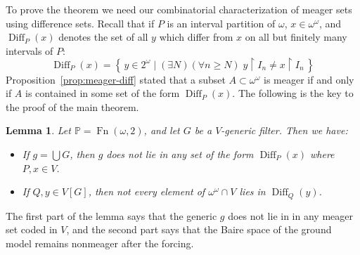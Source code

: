 \documentclass[11pt,oneside,a4paper]{amsbook}
\newcommand{\set}[1]{\left\{\,#1\,\right\}}
\newcommand{\PP}{\mathbb P}
\DeclareMathOperator{\Diff}{Diff}
\DeclareMathOperator{\Fn}{Fn}
\theoremstyle{definition}
\theoremstyle{plain}
\newtheorem{lemma}[theorem]{Lemma}
\theoremstyle{definition}
\theoremstyle{remark}
\numberwithin{equation}{section}
\numberwithin{figure}{section}
\begin{document}
To prove the theorem we need our combinatorial characterization of meager sets using difference sets. Recall that if $P$ is an interval partition of $\omega$, $x\in\omega^\omega$, and $\Diff_P(x)$ denotes the set of all $y$ which differ from $x$ on all but finitely many intervals of $P$:
\[\Diff_P(x)=\set{y\in2^\omega\mid (\exists N)(\forall n\geq N)\;y\restriction I_n\neq x\restriction I_n}
\]
Proposition~\ref{prop:meager-diff} stated that a subset $A\subset\omega^\omega$ is meager if and only if $A$ is contained in some set of the form $\Diff_P(x)$. The following is the key to the proof of the main theorem.

\begin{lemma}
  \label{lem:cohen-meager}
  Let $\PP=\Fn(\omega,2)$, and let $G$ be a $V$-generic filter. Then we have:
  \begin{itemize}
    \item If $g=\bigcup G$, then $g$ does not lie in any set of the form $\Diff_P(x)$ where $P,x\in V$.
    \item If $Q,y\in V[G]$, then not every element of $\omega^\omega\cap V$ lies in $\Diff_Q(y)$.
  \end{itemize}
\end{lemma}

The first part of the lemma says that the generic $g$ does not lie in in any meager set coded in $V$, and the second part says that the Baire space of the ground model remains nonmeager after the forcing.
\end{document}
